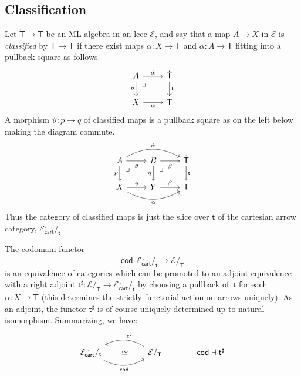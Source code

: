 \documentclass[12pt,reqno]{amsart}
\newcommand{\EE}{\ensuremath{\mathcal{E}}}
\renewcommand{\to}{\ensuremath{\rightarrow}}
\newcommand{\too}{\ensuremath{\longrightarrow}}
\renewcommand{\t}{\ensuremath{\mathsf{t}}}
\newcommand{\T}{\ensuremath{\mathsf{T}}}
\newcommand{\TT}{\ensuremath{\dot{\mathsf{T}}}}
\newcommand{\pbcorner}{\arrow[dr,phantom,"\lrcorner" very near start, shift right=.5ex]} %
\theoremstyle{remark}
\theoremstyle{definition}
\begin{document}
\subsection{Classification}\label{sec:classify}

Let $\TT \to \T$ be an ML-algebra in an lccc $\EE$, and say that a map $A\to X$ in $\EE$ is \emph{classified} by $\TT \to \T$ if there exist maps $\alpha : X \to \T$ and $\dot{\alpha} : A \to \TT$ fitting into a pullback square as follows.
\begin{equation}\label{eq:classifiedfamilies}
\begin{tikzcd}
	 A \ar[d, swap, "p"] \pbcorner \ar[r, "\dot{\alpha}"] & \TT \ar[d, "\t"] \\  
	X \ar[r, swap, "\alpha"] & \T 
 \end{tikzcd}
 \end{equation}
 A morphism $\vartheta : p \to q$ of classified maps is a pullback square as on the left below making the diagram commute.
 \begin{equation}\label{eq:classifiedfamilies2}
\begin{tikzcd}
	A \ar[d,swap, "p"] \ar[r,swap, "\dot{\vartheta}"]  \ar[rr, bend left, "\dot{\alpha}"]  \pbcorner & B \ar[d,swap, "q"]   \ar[r,swap,  "\dot{\beta}"] \pbcorner & \TT \ar[d, "\t"]  \\  
	X \ar[r, "\vartheta"] \ar[rr,swap, bend right, "\alpha"] & Y  \ar[r, "{\beta}"] &  \T
 \end{tikzcd}
 \end{equation}
 Thus the category of classified maps is just the slice over $\t$ of the cartesian arrow category, $\EE^{\downarrow}_{\mathsf{cart}}/_{\t}$.

The codomain functor
\[
\mathsf{cod} : \EE^{\downarrow}_{\mathsf{cart}}/_{\t} \too \EE/_\T
\]
is an equivalence of categories which can be promoted to an adjoint equivalence with a right adjoint $\t^{\sharp} : \EE/_\T \to \EE^{\downarrow}_{\mathsf{cart}}/_{\t}$ by choosing a pullback of~$\t$ for each $\alpha : X \to \T$ (this determines the strictly functorial action on arrows uniquely).  As an adjoint, the functor $\t^{\sharp}$ is of course uniquely determined up to natural isomorphism.  Summarizing, we have:
 \begin{equation}\label{eq:slice adjunction}
\begin{tikzcd}
 \EE^{\downarrow}_{\mathsf{cart}}/_{\t}  \ar[rr, bend right, swap, "{\mathsf{cod} }"] \ar[rr, phantom, description, "{\simeq}"] && \ar[ll, bend right, swap, "{\t^{\sharp}}"] \EE/_\T & \quad \mathsf{cod} \dashv \t^{\sharp}
 \end{tikzcd}
 \end{equation}
\end{document}
